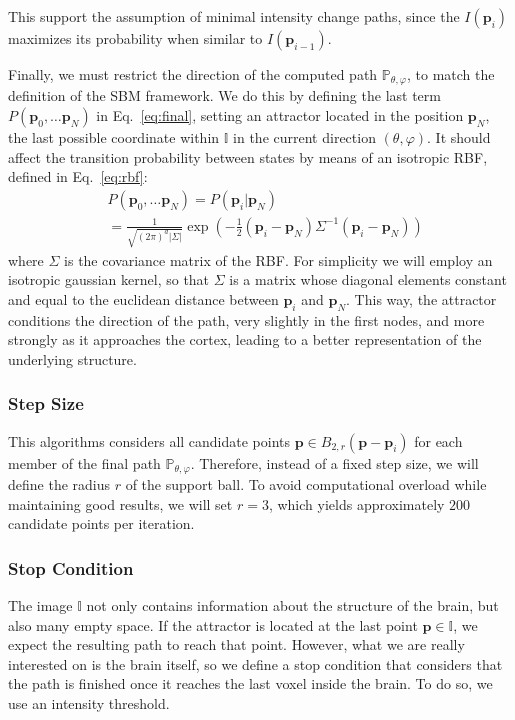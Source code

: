 This support the assumption of minimal intensity change paths, since the $I(\mathbf{p}_i)$ maximizes its probability when similar to $I(\mathbf{p}_{i-1})$. 

Finally, we must restrict the direction of the computed path $\mathbb{P}_{\theta,\varphi}$, to match the definition of the \ac{SBM} framework. We do this by defining the last term $P(\mathbf{p}_0, \dots \mathbf{p}_N)$ in Eq.~\ref{eq:final}, setting an attractor located in the position $\mathbf{p}_N$, the last possible coordinate within $\mathbb{I}$ in the current direction $(\theta,\varphi)$. It should affect the transition probability between states by means of an isotropic \acf{RBF}, defined in Eq.~\ref{eq:rbf}:
\begin{align}\label{eq:rbf}
&P(\mathbf{p}_0, \dots \mathbf{p}_N) = P(\mathbf{p}_i|\mathbf{p}_N)  \\&= \frac{1}{\sqrt{(2\pi)^d|\Sigma|}} \exp\left(-\frac{1}{2}(\mathbf{p}_i-\mathbf{p}_N)\Sigma^{-1}(\mathbf{p}_i-\mathbf{p}_N)\right) 
\end{align}
where $\Sigma$ is the covariance matrix of the \ac{RBF}. For simplicity we will employ an isotropic gaussian kernel, so that $\Sigma$ is a matrix whose diagonal elements constant and equal to the euclidean distance between $\mathbf{p}_i$ and $\mathbf{p}_N$. This way, the attractor conditions the direction of the path, very slightly in the first nodes, and more strongly as it approaches the cortex, leading to a better representation of the underlying structure.  

\subsubsection{Step Size}
This algorithms considers all candidate points $\mathbf{p} \in B_{2,r}(\mathbf{p}-\mathbf{p}_i)$ for each member of the final path $\mathbb{P}_{\theta,\varphi}$. Therefore, instead of a fixed step size, we will define the radius $r$ of the support ball. To avoid computational overload while maintaining good results, we will set $r=3$, which yields approximately $200$ candidate points per iteration. 

\subsubsection{Stop Condition}
The image $\mathbb{I}$ not only contains information about the structure of the brain, but also many empty space. If the attractor is located at the last point $ \mathbf{p} \in \mathbb{I}$, we expect the resulting path to reach that point. However, what we are really interested on is the brain itself, so we define a stop condition that considers that the path is finished once it reaches the last voxel inside the brain. To do so, we use an intensity threshold. 

